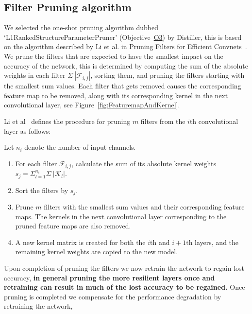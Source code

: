 \documentclass[../Dissertation.tex]{subfiles}
\begin{document}

\subsection{Filter Pruning algorithm}\label{sec:FilterPruningAlgo}
We selected the one-shot pruning algorithm dubbed `L1RankedStructureParameterPruner' (Objective~\hyperref[obj:SelCompress]{O3}) by Distiller, this is based on the algorithm described by Li et al. in Pruning Filters for Efficient Convnets~\autocite{liPruningFiltersEfficient2017}. 
We prune the filters that are expected to have the smallest impact on the accuracy of the network, this is determined by computing the sum of the absolute weights in each filter $\Sigma~|\mathcal{F}_{i,j}|$, sorting them, and pruning the filters starting with the smallest sum values.
Each filter that gets removed causes the corresponding feature map to be removed, along with its corresponding kernel in the next convolutional layer, see Figure~\ref{fig:FeaturemapAndKernel}. \\


\begin{singlespace}
\noindent Li et al~\autocite{liPruningFiltersEfficient2017} defines the procedure for pruning $m$ filters from the $i$th convolutional layer as follows:

\noindent Let $n_i$ denote the number of input channels.
    \begin{enumerate}
        \item For each filter $\mathcal{F}_{i,j}$, calculate the sum of its absolute kernel weights $s_{j} = \Sigma_{l=1}^{n_{i}}\Sigma~|\mathcal{K}_{l}|$.
        \item Sort the filters by $s_j$.
        \item Prune $m$ filters with the smallest sum values and their corresponding feature maps. The kernels in the next convolutional layer corresponding to the pruned feature maps are also removed.
        \item A new kernel matrix is created for both the $i$th and $i + 1$th layers, and the remaining kernel weights are copied to the new model.
    \end{enumerate}
\end{singlespace}

\noindent Upon completion of pruning the filters we now retrain the network to regain lost accuracy, \textbf{\color{red}in general pruning the more resilient layers once and retraining can result in much of the lost accuracy to be regained.}
Once pruning is completed we compensate for the performance degradation by retraining the network, 
\end{document}
